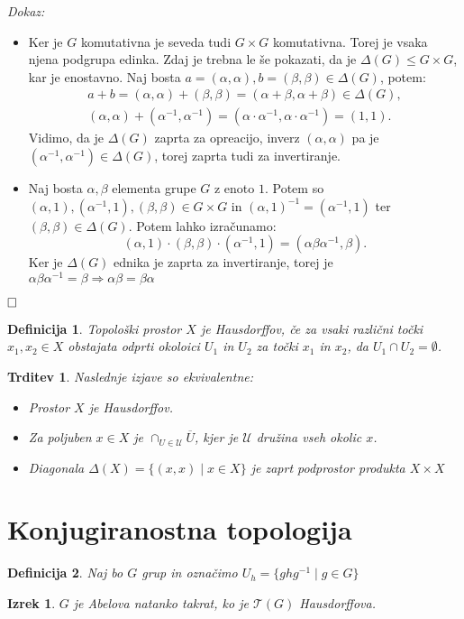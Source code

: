\documentclass[a4paper,12pt]{article}
\def\qed{$\hfill\Box$}   %
\newtheorem{izrek}{Izrek}
\newtheorem{trditev}{Trditev}
\newtheorem{definicija}{Definicija}
\begin{document}
\noindent
{\em Dokaz:\/}
    \begin{itemize}
        \item[($\Rightarrow$)] Ker je $G$ komutativna je seveda tudi $G \times G$ komutativna. Torej je vsaka njena podgrupa edinka.
            Zdaj je trebna le še pokazati, da je $\Delta(G) \le G \times G$, kar je enostavno. Naj bosta $a = (\alpha, \alpha), b = (\beta, \beta) \in \Delta(G)$, potem:
            \begin{gather*}
                a + b = (\alpha, \alpha) + (\beta, \beta) = (\alpha + \beta, \alpha + \beta) \in \Delta(G), \\
                (\alpha, \alpha) + (\alpha^{-1}, \alpha^{-1}) = (\alpha \cdot \alpha^{-1}, \alpha \cdot \alpha^{-1}) = (1,1).
            \end{gather*}
            Vidimo, da je $\Delta(G)$ zaprta za opreacijo, inverz $(\alpha, \alpha)$ pa je $(\alpha^{-1}, \alpha^{-1}) \in \Delta(G)$, torej zaprta tudi za invertiranje.
        \item[($\Leftarrow$)] Naj bosta $\alpha, \beta$ elementa grupe $G$ z enoto $1$.
        Potem so $(\alpha,1), (\alpha^{-1}, 1), (\beta, \beta) \in G \times G$ in
            $(\alpha,1)^{-1} = (\alpha^{-1},1)$ ter $(\beta, \beta) \in \Delta(G)$. Potem lahko izračunamo:
            \[(\alpha,1) \cdot (\beta, \beta) \cdot (\alpha^{-1}, 1) = (\alpha\beta\alpha^{-1}, \beta).\]
            Ker je $\Delta(G)$ ednika je zaprta za invertiranje, torej je $\alpha\beta\alpha^{-1} = \beta \Rightarrow \alpha\beta = \beta\alpha$
    \end{itemize}
\qed

\begin{definicija}
    Topološki prostor $X$ je Hausdorffov, če za vsaki različni točki $x_1, x_2 \in X$ obstajata odprti okoloici $U_1$ in $U_2$ za točki $x_1$ in $x_2$, da $U_1 \cap U_2 = \emptyset$.
\end{definicija}

\begin{trditev}
    Naslednje izjave so ekvivalentne:
    \begin{itemize}
        \item[\rm (i)] Prostor $X$ je Hausdorffov.
        \item[\rm (ii)] Za poljuben $x \in X$ je $\cap_{U \in \mathcal{U}} \overline{U}$, kjer je $\mathcal{U}$ družina vseh okolic $x$.
        \item[\rm (iii)] Diagonala $\Delta(X) = \{(x,x) \mid x \in X \} $ je zaprt podprostor produkta $X \times X$
    \end{itemize}
\end{trditev}


\section{Konjugiranostna topologija}

\begin{definicija}
    Naj bo $G$ grup in označimo $U_h = \{ghg^{-1} \mid g \in G \}$
\end{definicija}

\begin{izrek}
    $G$ je Abelova natanko takrat, ko je $\mathcal{T}(G)$ Hausdorffova.
\end{izrek}
\end{document}
